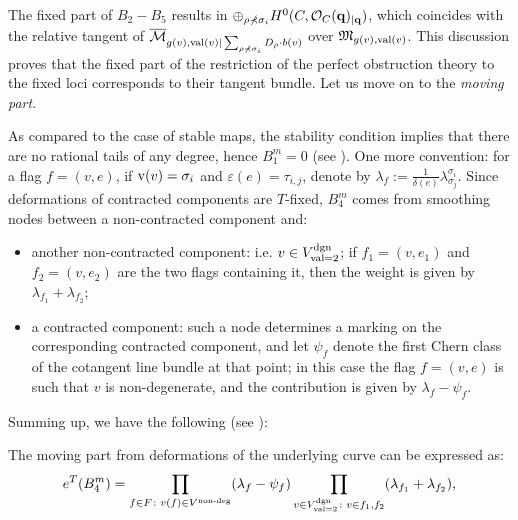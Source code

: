 The fixed part of $B_2-B_5$ results in $\oplus_{\rho\nprec\sigma_i}H^0(C,\mathcal{O}_C(\mathbf q)_{|\mathbf q})$, which coincides with the relative tangent of $\overline{\mathcal M}_{g(v),\operatorname{val}(v)|\sum_{\rho\nprec\sigma_i}D_\rho\cdot b(v)}$ over $\mathfrak M_{g(v),\operatorname{val}(v)}$. This discussion proves that the fixed part of the restriction of the perfect obstruction theory to the fixed loci corresponds to their tangent bundle. Let us move on to the \emph{moving part}.

As compared to the case of stable maps, the stability condition implies that there are no rational tails of any degree, hence $B_1^m=0$ (see \cite[Lemma 7.2]{HolgerSpielberg}). 
One more convention: for a flag $f=(v,e)$, if $\operatorname{v}(v)=\sigma_i$ and $\varepsilon(e)=\tau_{i,j}$, denote by $\lambda_f:=\frac{1}{\delta(e)}\lambda^{\sigma_i}_{\sigma_j}$.
Since deformations of contracted components are $T$-fixed, $B_4^m$ comes from smoothing nodes between a non-contracted component and:
\begin{itemize}
 \item another non-contracted component: i.e. $v\in V^\text{dgn}_{\operatorname{val}=2}$; if $f_1=(v,e_1)$ and $f_2=(v,e_2)$ are the two flags containing it, then the weight is given by $\lambda_{f_1}+\lambda_{f_2}$;
 \item a contracted component: such a node determines a marking on the corresponding contracted component, and let $\psi_f$ denote the first Chern class of the cotangent line bundle at that point; in this case the flag $f=(v,e)$ is such that $v$ is non-degenerate, and the contribution is given by $\lambda_f-\psi_f$.
\end{itemize}
Summing up, we have the following (see \cite[Lemma 7.3]{HolgerSpielberg}):
\begin{lem}
 The moving part from deformations of the underlying curve can be expressed as:
 \[
  e^T(B_4^m)=\prod_{f\in F\colon v(f)\in V^{\text{non-deg}}}(\lambda_f-\psi_f)\prod_{v\in V^\text{dgn}_{\operatorname{val}=2}\colon v\in f_1,f_2}(\lambda_{f_1}+\lambda_{f_2}),
 \]
\end{lem}

